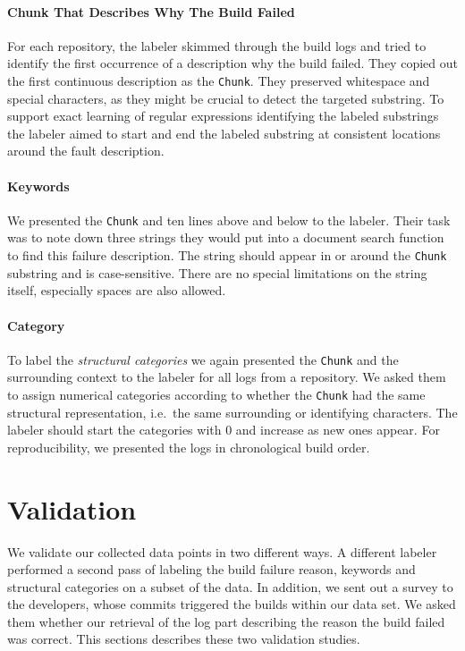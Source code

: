 \documentclass[\myrootdir/main.tex]{subfiles}
\begin{document}
\paragraph{Chunk That Describes Why The Build Failed}
For each repository, the labeler skimmed through the build logs and tried to identify the first occurrence of a description why the build failed.
They copied out the first continuous description as the \texttt{Chunk}.
They preserved whitespace and special characters, as they might be crucial to detect the targeted substring.
To support exact learning of regular expressions identifying the labeled substrings the labeler aimed to start and end the labeled substring at consistent locations around the fault description.

\paragraph{Keywords}
We presented the \texttt{Chunk} and ten lines above and below to the labeler.
Their task was to note down three strings they would put into a document search function to find this failure description.
The string should appear in or around the \texttt{Chunk} substring and is case-sensitive.
There are no special limitations on the string itself, especially spaces are also allowed.

\paragraph{Category}
To label the \emph{structural categories} we again presented the \texttt{Chunk} and the surrounding context to the labeler for all logs from a repository.
We asked them to assign numerical categories according to whether the \texttt{Chunk} had the same structural representation, i.e.\ the same surrounding or identifying characters.
The labeler should start the categories with 0 and increase as new ones appear.
For reproducibility, we presented the logs in chronological build order.

\section{Validation}
We validate our collected data points in two different ways.
A different labeler performed a second pass of labeling the build failure reason, keywords and structural categories on a subset of the data.
In addition, we sent out a survey to the developers, whose commits triggered the builds within our data set.
We asked them whether our retrieval of the log part describing the reason the build failed was correct.
This sections describes these two validation studies.
\end{document}
